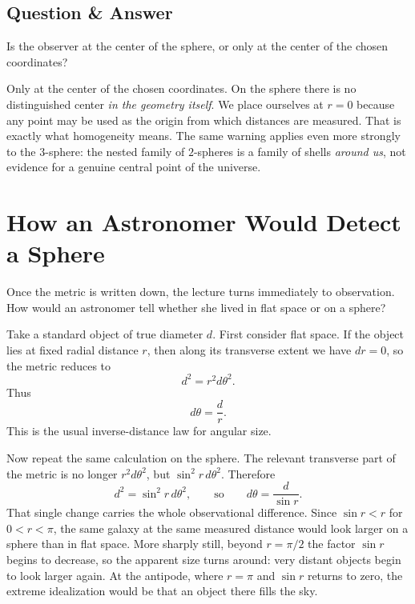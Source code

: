 \subsection{Question \& Answer}

Is the observer at the center of the sphere, or only at the center of the chosen coordinates?

Only at the center of the chosen coordinates. On the sphere there is no distinguished center \emph{in the geometry itself}. We place ourselves at \(r=0\) because any point may be used as the origin from which distances are measured. That is exactly what homogeneity means. The same warning applies even more strongly to the \(3\)-sphere: the nested family of \(2\)-spheres is a family of shells \emph{around us}, not evidence for a genuine central point of the universe.

\section{How an Astronomer Would Detect a Sphere}

Once the metric is written down, the lecture turns immediately to observation. How would an astronomer tell whether she lived in flat space or on a sphere?

Take a standard object of true diameter \(d\). First consider flat space. If the object lies at fixed radial distance \(r\), then along its transverse extent we have \(dr=0\), so the metric reduces to
\begin{equation}
d^2 = r^2 d\theta^2.
\end{equation}
Thus
\begin{equation}
d\theta = \frac{d}{r}.
\end{equation}
This is the usual inverse-distance law for angular size.

Now repeat the same calculation on the sphere. The relevant transverse part of the metric is no longer \(r^2 d\theta^2\), but \(\sin^2 r\, d\theta^2\). Therefore
\begin{equation}
d^2 = \sin^2 r\, d\theta^2,
\qquad\text{so}\qquad
d\theta = \frac{d}{\sin r}.
\end{equation}
That single change carries the whole observational difference. Since \(\sin r < r\) for \(0<r<\pi\), the same galaxy at the same measured distance would look larger on a sphere than in flat space. More sharply still, beyond \(r=\pi/2\) the factor \(\sin r\) begins to decrease, so the apparent size turns around: very distant objects begin to look larger again. At the antipode, where \(r=\pi\) and \(\sin r\) returns to zero, the extreme idealization would be that an object there fills the sky.

